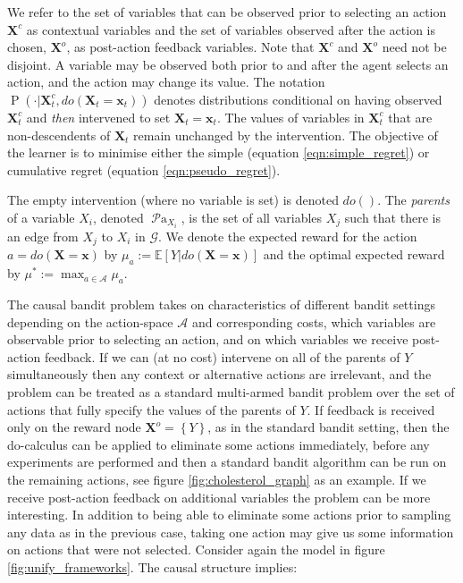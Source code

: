 \documentclass[11pt,a4paper,twoside]{report}
\newcommand{\actions}{\mathcal{A}}
\newcommand{\actionspace}{\mathcal{A}}
\newcommand{\E}[1]{\mathbb E\left[{#1}\right]}
\newcommand{\set}[1]{\left\{#1\right\}}
\renewcommand{\P}[1]{\operatorname{P}\left(#1\right)}
\newcommand{\parents}[1]{\operatorname{\mathcal{P}a}_{#1}}
\renewcommand{\vec}[1]{\boldsymbol{#1}}
\theoremstyle{plain}
\theoremstyle{definition}
\begin{document}
We refer to the set of variables that can be observed prior to selecting an action $\vec{X}^c$ as contextual variables and the set of variables observed after the action is chosen, $\vec{X}^o$, as post-action feedback variables. Note that $\vec{X}^c$ and $\vec{X}^o$ need not be disjoint. A variable may be observed both prior to and after the agent selects an action, and the action may change its value. The notation $\P{\cdot|\vec{X}^c_t, do(\vec{X}_t = \vec{x}_t)}$ denotes distributions conditional on having observed $\vec{X}^c_t$ and \emph{then} intervened to set $\vec{X}_t = \vec{x}_t$. The values of variables in $\vec{X}^c_t$ that are non-descendents of $\vec{X}_t$ remain unchanged by the intervention. The objective of the learner is to minimise either the simple (equation \ref{eqn:simple_regret}) or cumulative regret (equation \ref{eqn:pseudo_regret}). 

The empty intervention (where no variable is set) is denoted $do()$. The \emph{parents} of a variable $X_i$, denoted $\parents{X_i}$, is the set of all variables $X_j$ such that there is an edge from $X_j$ to $X_i$ in $\mathcal{G}$. We denote the expected reward for the action $a = do(\vec{X} = \vec{x})$ by $\mu_{a} := \E{Y | do(\vec{X} = \vec{x})}$ and the optimal expected reward by $\mu^* := \max_{a\in\actions} \mu_{a}$. 

The causal bandit problem takes on characteristics of different bandit settings depending on the action-space $\actionspace$ and corresponding costs, which variables are observable prior to selecting an action, and on which variables we receive post-action feedback. If we can (at no cost) intervene on all of the parents of $Y$ simultaneously then any context or alternative actions are irrelevant, and the problem can be treated as a standard multi-armed bandit problem over the set of actions that fully specify the values of the parents of $Y$. If feedback is received only on the reward node $\vec{X}^o = \set{Y}$, as in the standard bandit setting, then the do-calculus can be applied to eliminate some actions immediately, before any experiments are performed and then a standard bandit algorithm can be run on the remaining actions, see figure \ref{fig:cholesterol_graph} as an example. If we receive post-action feedback on additional variables the problem can be more interesting. In addition to being able to eliminate some actions prior to sampling any data as in the previous case, taking one action may give us some information on actions that were not selected. Consider again the model in figure \ref{fig:unify_frameworks}. The causal structure implies: 
\end{document}

